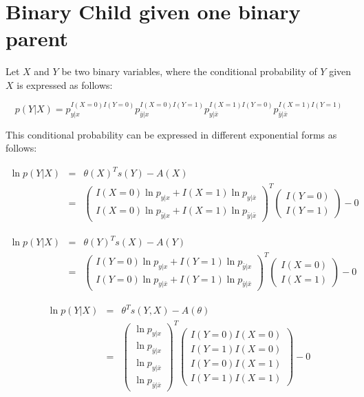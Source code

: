\documentclass[11pt, oneside]{article}   	%
\numberwithin{figure}{section}
\numberwithin{equation}{section}
\numberwithin{table}{section}
\begin{document}
\section{Binary Child given one binary parent}

Let $X$ and $Y$ be two binary variables, where the conditional probability of $Y$ given $X$ is expressed as follows:

$$ p(Y|X) = p_{y|x}^{I(X=0)I(Y=0)}p_{\bar{y}|x}^{I(X=0)I(Y=1)}p_{y|\bar{x}}^{I(X=1)I(Y=0)}p_{\bar{y}|\bar{x}}^{I(X=1)I(Y=1)}$$


This conditional probability can be expressed in different exponential forms as follows:


\begin{eqnarray*}
\ln p(Y|X) &=& \theta(X)^Ts(Y) - A(X) \\
&=&
\begin{pmatrix}
I(X=0)\ln p_{y|x}  + I(X=1)\ln p_{y|\bar{x}}\\
I(X=0)\ln p_{\bar{y}|x}  + I(X=1)\ln p_{\bar{y}|\bar{x}}
\end{pmatrix}^T
\begin{pmatrix}
I(Y=0) \\
I(Y=1)
\end{pmatrix}
- 0
\end{eqnarray*}


\begin{eqnarray*}
\ln p(Y|X) &=& \theta(Y)^T s(X) - A(Y) \\
&=&
\begin{pmatrix}
I(Y=0)\ln p_{y|x}  + I(Y=1)\ln p_{\bar{y}|x}\\
I(Y=0)\ln p_{y|\bar{x}}  + I(Y=1)\ln p_{\bar{y}|\bar{x}}
\end{pmatrix}^T
\begin{pmatrix}
I(X=0) \\
I(X=1)
\end{pmatrix}
- 0
\end{eqnarray*}


\begin{eqnarray*}
\ln p(Y|X) &=& \theta^T s(Y,X) - A(\theta) \\
&=&
\begin{pmatrix}
\ln p_{y|x}\\
\ln p_{\bar{y}|x}\\
\ln p_{y|\bar{x}}\\
\ln p_{\bar{y}|\bar{x}}
\end{pmatrix}^T
\begin{pmatrix}
I(Y=0)I(X=0) \\
I(Y=1)I(X=0) \\
I(Y=0)I(X=1) \\
I(Y=1)I(X=1) 
\end{pmatrix}
- 0
\end{eqnarray*}
\end{document}
